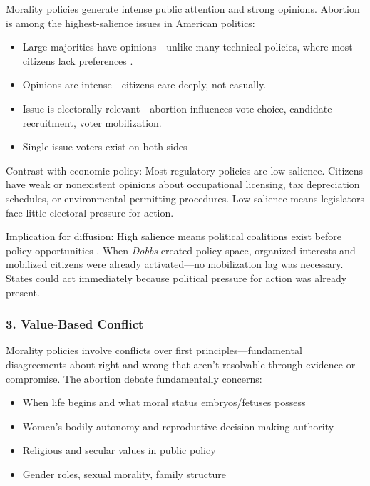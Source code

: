 Morality policies generate intense public attention and strong opinions. Abortion is among the highest-salience issues in American politics:

\begin{itemize}
\item Large majorities have opinions---unlike many technical policies, where most citizens lack preferences \parencite{dohertyBroadPublicSupport2024}.
\item Opinions are intense---citizens care deeply, not casually.
\item Issue is electorally relevant---abortion influences vote choice, candidate recruitment, voter mobilization.
\item Single-issue voters exist on both sides
\end{itemize}

Contrast with economic policy: Most regulatory policies are low-salience. Citizens have weak or nonexistent opinions about occupational licensing, tax depreciation schedules, or environmental permitting procedures. Low salience means legislators face little electoral pressure for action.

Implication for diffusion: High salience means political coalitions exist before policy opportunities \parencite{mooneyLegislativeMoralityAmerican1995,mooneyInfluenceValuesConsensus2000}. When \textit{Dobbs} created policy space, organized interests and mobilized citizens were already activated---no mobilization lag was necessary. States could act immediately because political pressure for action was already present.

\subsubsection{3. Value-Based Conflict}

Morality policies involve conflicts over first principles---fundamental disagreements about right and wrong that aren't resolvable through evidence or compromise. The abortion debate fundamentally concerns:

\begin{itemize}
\item When life begins and what moral status embryos/fetuses possess
\item Women's bodily autonomy and reproductive decision-making authority
\item Religious and secular values in public policy
\item Gender roles, sexual morality, family structure
\end{itemize}

